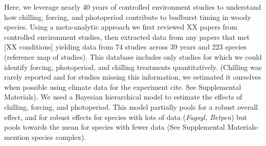 \documentclass[11pt,letter]{article}
\begin{document}
\par Here, we leverage nearly 40 years of controlled environment studies to understand how chilling, forcing, and photoperiod contribute to budburst timing in woody species. Using a meta-analytic approach we first reviewed XX papers from controlled environment studies, then extracted data from any papers that met [XX conditions] yielding data from 74 studies across 39 years and 223 species (reference map of studies).  This database includes only studies for which we could identify forcing, photoperiod, and chilling treatments quantitatively. (Chilling was rarely reported and for studies missing this information, we estimated it ourselves when possible using climate data for the experiment cite. See Supplemental Materials). We used a Bayesian hierarchical model to estimate the effects of chilling, forcing, and photoperiod. This model partially pools for a robust overall effect, and for robust effects for species with lots of data (\emph{Fagsyl, Betpen}) but pools towards the mean for species with fewer data (See Supplemental Materials- mention species complex).\\
\end{document}
